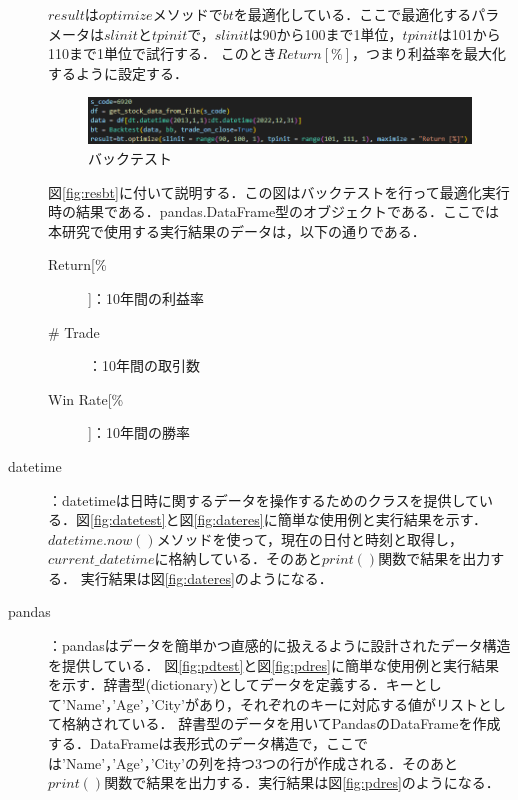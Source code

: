 \begin{description}
   $result$は$optimize$メソッドで$bt$を最適化している．ここで最適化するパラメータは\(slinit\)と\(tpinit\)で，\(slinit\)は90から100まで1単位，\(tpinit\)は101から110まで1単位で試行する．
   このとき\( Return[\%]\)，つまり利益率を最大化するように設定する．
   \begin{figure}[H]
    \centering
    \includegraphics[width=150mm]{fig/data_bt_result.png}
    \caption{バックテスト}
    \label{fig:databt}
   \end{figure}
   図\ref{fig:resbt}に付いて説明する．この図はバックテストを行って最適化実行時の結果である．pandas.DataFrame型のオブジェクトである．ここでは本研究で使用する実行結果のデータは，以下の通りである．
   \begin{description}
    \item[Return[\%]]：10年間の利益率
    \item [\# Trade]：10年間の取引数
    \item [Win Rate[\%]]：10年間の勝率
   \end{description}
   \item [datetime]：datetimeは日時に関するデータを操作するためのクラスを提供している\cite{datetime}．図\ref{fig:datetest}と図\ref{fig:dateres}に簡単な使用例と実行結果を示す．$datetime.now()$メソッドを使って，現在の日付と時刻と取得し，$current\_datetime$に格納している．そのあと$print()$関数で結果を出力する．
  実行結果は図\ref{fig:dateres}のようになる．





  
   
  \item [pandas]：pandasはデータを簡単かつ直感的に扱えるように設計されたデータ構造を提供している\cite{pandas}．
  図\ref{fig:pdtest}と図\ref{fig:pdres}に簡単な使用例と実行結果を示す．辞書型(dictionary)としてデータを定義する．キーとして'Name'，'Age'，'City'があり，それぞれのキーに対応する値がリストとして格納されている．
  辞書型のデータを用いてPandasのDataFrameを作成する．DataFrameは表形式のデータ構造で，ここでは'Name'，'Age'，'City'の列を持つ3つの行が作成される．そのあと$print()$関数で結果を出力する．実行結果は図\ref{fig:pdres}のようになる．


\end{description}
